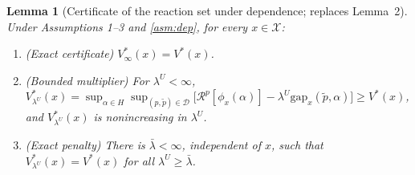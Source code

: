\documentclass[11pt]{article}
\newtheorem{lemma}{Lemma}
\theoremstyle{definition}
\theoremstyle{remark}
\newcommand{\X}{\mathcal{X}}
\newcommand{\D}{\mathcal{D}}
\newcommand{\tp}{\tilde{p}}
\newcommand{\R}{\mathcal{R}}
\newcommand{\gap}{\mathrm{gap}}
\begin{document}
\begin{lemma}[Certificate of the reaction set under dependence; replaces Lemma~2]\label{lem:cert}
Under Assumptions 1--3 and \ref{asm:dep}, for every $x\in\X$:
\begin{enumerate}[label=(\roman*),nosep]
\item (Exact certificate) $V^*_\infty(x)=V^*(x)$.
\item (Bounded multiplier) For $\lambda^U<\infty$, $V^*_{\lambda^U}(x)=\sup_{\alpha\in H}\sup_{(p,\tp)\in\D}\big[\R^p[\phi_x(\alpha)]-\lambda^U\gap_x(\tp,\alpha)\big]\ge V^*(x)$, and $V^*_{\lambda^U}(x)$ is nonincreasing in $\lambda^U$.
\item (Exact penalty) There is $\bar\lambda<\infty$, independent of $x$, such that $V^*_{\lambda^U}(x)=V^*(x)$ for all $\lambda^U\ge\bar\lambda$.
\end{enumerate}
\end{lemma}
\end{document}
